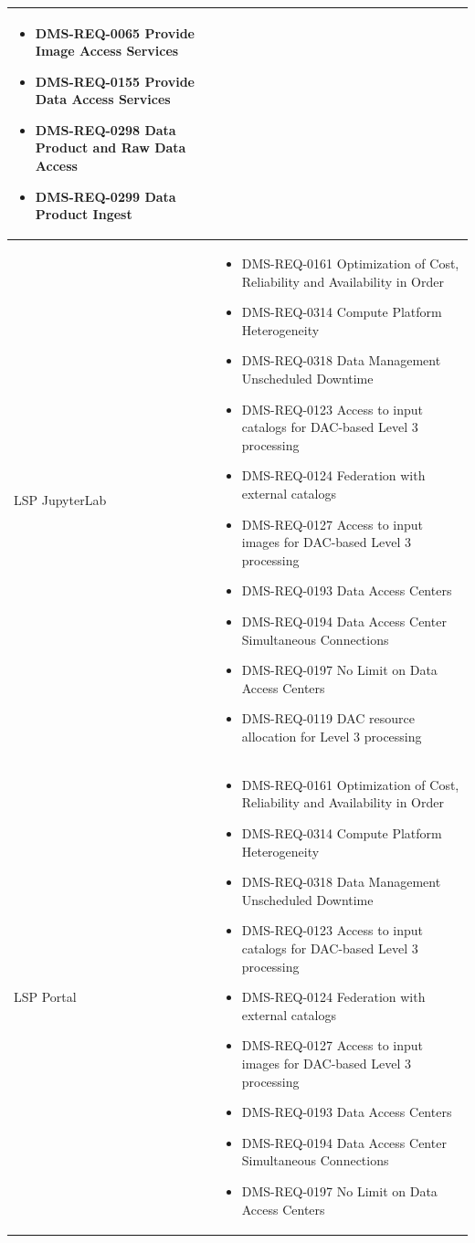\documentclass[DM,lsstdraft,toc]{lsstdoc}
\begin{document}
\begin{xtabular}{|p{0.1\textwidth}|p{0.85\textwidth}|}
\begin{itemize}
\item DMS-REQ-0065 Provide Image Access Services
\item DMS-REQ-0155 Provide Data Access Services
\item DMS-REQ-0298 Data Product and Raw Data Access
\item DMS-REQ-0299 Data Product Ingest \end{itemize} \\ \hline
LSP JupyterLab &
\begin{itemize} \item DMS-REQ-0161 Optimization of Cost, Reliability and Availability in Order
\item DMS-REQ-0314 Compute Platform Heterogeneity
\item DMS-REQ-0318 Data Management Unscheduled Downtime
\item DMS-REQ-0123 Access to input catalogs for DAC-based Level 3 processing
\item DMS-REQ-0124 Federation with external catalogs
\item DMS-REQ-0127 Access to input images for DAC-based Level 3 processing
\item DMS-REQ-0193 Data Access Centers
\item DMS-REQ-0194 Data Access Center Simultaneous Connections
\item DMS-REQ-0197 No Limit on Data Access Centers
\item DMS-REQ-0119 DAC resource allocation for Level 3 processing \end{itemize} \\ \hline
LSP Portal &
\begin{itemize} \item DMS-REQ-0161 Optimization of Cost, Reliability and Availability in Order
\item DMS-REQ-0314 Compute Platform Heterogeneity
\item DMS-REQ-0318 Data Management Unscheduled Downtime
\item DMS-REQ-0123 Access to input catalogs for DAC-based Level 3 processing
\item DMS-REQ-0124 Federation with external catalogs
\item DMS-REQ-0127 Access to input images for DAC-based Level 3 processing
\item DMS-REQ-0193 Data Access Centers
\item DMS-REQ-0194 Data Access Center Simultaneous Connections
\item DMS-REQ-0197 No Limit on Data Access Centers

\end{itemize}
\end{xtabular}
\end{document}
